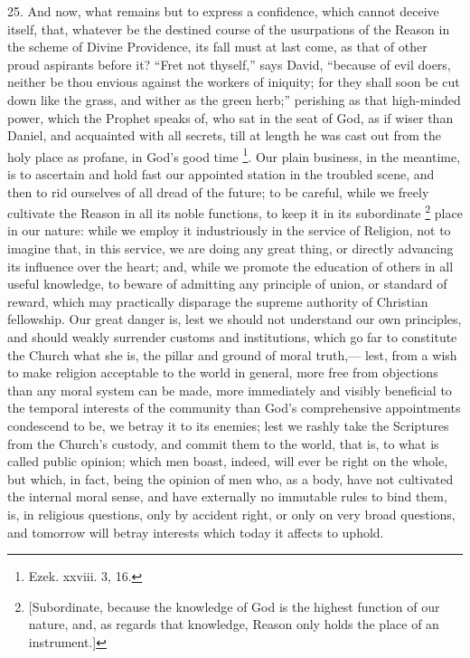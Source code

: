 25. And now, what remains but to express a confidence, which cannot
deceive itself, that, whatever be the destined course of the
usurpations of the Reason in the scheme of Divine Providence, its fall
must at last come, as that of other proud aspirants before it?
``Fret not thyself,'' says David, ``because of evil doers,
neither be thou envious against the workers of iniquity; for they
shall soon be cut down like the grass, and wither as the green
herb;'' perishing as that high-minded power, which the Prophet
speaks of, who sat in the seat of God, as if wiser than Daniel, and
acquainted with all secrets, till at length he was cast out from the
holy place as profane, in God's good time \footnote{Ezek. xxviii. 3,
16.}. Our
plain business, in the meantime, is to ascertain and hold fast our
appointed station in the troubled scene, and then to rid ourselves of
all dread of the future; to be careful, while we freely cultivate the
Reason in all its noble functions, to keep it in its subordinate \footnote{[Subordinate,
because the knowledge of God is the highest function of our nature,
and, as regards that knowledge, Reason only holds the place of an
instrument.]} place in our nature: while we employ it industriously in the
service of Religion, not to imagine that, in this service, we are
doing any great thing, or directly advancing its influence over the
heart; and, while we promote the education of others in all useful
knowledge, to beware of admitting any principle of union, or standard
of reward, which may practically disparage the supreme authority of
Christian fellowship. Our great danger is, lest we should not
understand our own principles, and should weakly surrender customs and
institutions, which go far to constitute the Church what she is, the
pillar and ground of moral truth,— lest, from a wish to make religion
acceptable to the world in general, more free from objections than any
moral system can be made, more immediately and visibly beneficial to
the temporal interests of the community than God's comprehensive
appointments condescend to be, we betray it to its enemies; lest we
rashly take the Scriptures from the Church's custody, and commit them
to the world, that is, to what is called public opinion; which men
boast, indeed, will ever be right on the whole, but which, in fact,
being the opinion of men who, as a body, have not cultivated the
internal moral sense, and have externally no immutable rules to bind
them, is, in religious questions, only by accident right, or only on
very broad questions, and tomorrow will betray interests which today
it affects to uphold.

